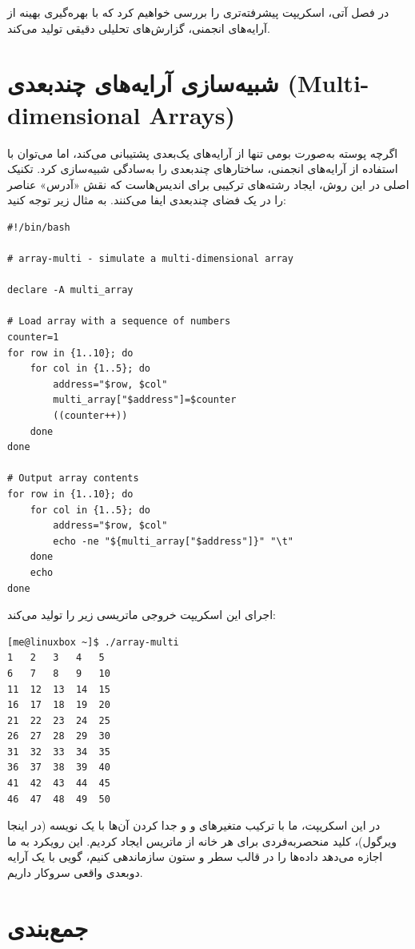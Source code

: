 در فصل آتی، اسکریپت پیشرفته‌تری را بررسی خواهیم کرد که با بهره‌گیری بهینه از آرایه‌های انجمنی، گزارش‌های تحلیلی دقیقی تولید می‌کند.

\section{شبیه‌سازی آرایه‌های چندبعدی (Multi-dimensional Arrays)}

اگرچه پوسته  به‌صورت بومی تنها از آرایه‌های یک‌بعدی پشتیبانی می‌کند، اما می‌توان با استفاده از آرایه‌های انجمنی، ساختارهای چندبعدی را به‌سادگی شبیه‌سازی کرد. تکنیک اصلی در این روش، ایجاد رشته‌های ترکیبی برای اندیس‌هاست که نقش «آدرس» عناصر را در یک فضای چندبعدی ایفا می‌کنند. به مثال زیر توجه کنید:

\begin{latin}
\begin{lstlisting}
#!/bin/bash

# array-multi - simulate a multi-dimensional array

declare -A multi_array

# Load array with a sequence of numbers
counter=1
for row in {1..10}; do
    for col in {1..5}; do
        address="$row, $col"
        multi_array["$address"]=$counter
        ((counter++))
    done
done

# Output array contents
for row in {1..10}; do
    for col in {1..5}; do
        address="$row, $col"
        echo -ne "${multi_array["$address"]}" "\t"
    done
    echo
done
\end{lstlisting}
\end{latin}

اجرای این اسکریپت خروجی ماتریسی زیر را تولید می‌کند:

\begin{latin}
\begin{lstlisting}
[me@linuxbox ~]$ ./array-multi
1	2	3	4	5
6	7	8	9	10
11	12	13	14	15
16	17	18	19	20
21	22	23	24	25
26	27	28	29	30
31	32	33	34	35
36	37	38	39	40
41	42	43	44	45
46	47	48	49	50
\end{lstlisting}
\end{latin}

در این اسکریپت، ما با ترکیب متغیرهای  و  و جدا کردن آن‌ها با یک نویسه (در اینجا ویرگول)، کلید منحصربه‌فردی برای هر خانه از ماتریس ایجاد کردیم. این رویکرد به ما اجازه می‌دهد داده‌ها را در قالب سطر و ستون سازماندهی کنیم، گویی با یک آرایه دو‌بعدی واقعی سروکار داریم.

\section{جمع‌بندی}

